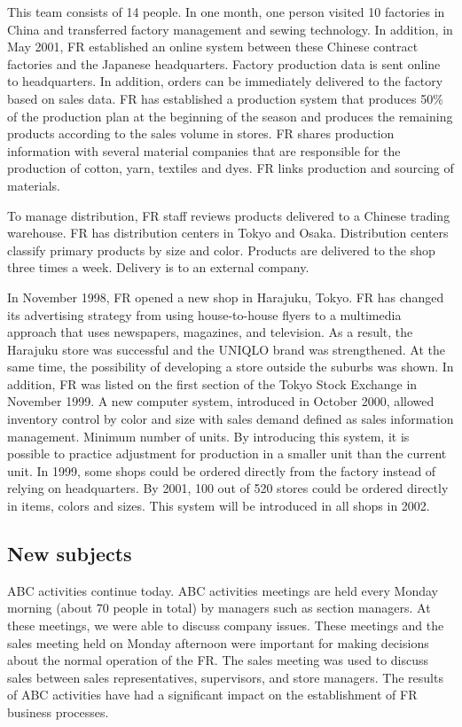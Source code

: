 \documentclass[12pt,a4paper]{article}
\begin{document}
This team consists of 14 people. In one month, one person visited 10
factories in China and transferred factory management and sewing
technology. In addition, in May 2001, FR established an online system
between these Chinese contract factories and the Japanese headquarters.
Factory production data is sent online to headquarters. In addition,
orders can be immediately delivered to the factory based on sales data.
FR has established a production system that produces 50\% of the
production plan at the beginning of the season and produces the
remaining products according to the sales volume in stores. FR shares
production information with several material companies that are
responsible for the production of cotton, yarn, textiles and dyes. FR
links production and sourcing of materials.

To manage distribution, FR staff reviews products delivered to a Chinese
trading warehouse. FR has distribution centers in Tokyo and Osaka.
Distribution centers classify primary products by size and color.
Products are delivered to the shop three times a week. Delivery is to an
external company.

In November 1998, FR opened a new shop in Harajuku, Tokyo. FR has
changed its advertising strategy from using house-to-house flyers to a
multimedia approach that uses newspapers, magazines, and television. As
a result, the Harajuku store was successful and the UNIQLO brand was
strengthened. At the same time, the possibility of developing a store
outside the suburbs was shown. In addition, FR was listed on the first
section of the Tokyo Stock Exchange in November 1999. A new computer
system, introduced in October 2000, allowed inventory control by color
and size with sales demand defined as sales information management.
Minimum number of units. By introducing this system, it is possible to
practice adjustment for production in a smaller unit than the current
unit. In 1999, some shops could be ordered directly from the factory
instead of relying on headquarters. By 2001, 100 out of 520 stores could
be ordered directly in items, colors and sizes. This system will be
introduced in all shops in 2002.

\hypertarget{new-subjects}{%
\subsection{New subjects}\label{new-subjects}}

ABC activities continue today. ABC activities meetings are held every
Monday morning (about 70 people in total) by managers such as section
managers. At these meetings, we were able to discuss company issues.
These meetings and the sales meeting held on Monday afternoon were
important for making decisions about the normal operation of the FR. The
sales meeting was used to discuss sales between sales representatives,
supervisors, and store managers. The results of ABC activities have had
a significant impact on the establishment of FR business processes.
\end{document}
